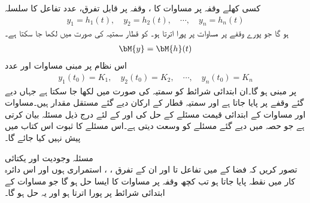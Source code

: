 کسی کھلے وقفہ  پر مساوات  کا ، وقفہ  پر قابل تفرق،  عدد  تفاعل کا سلسلہ
\begin{align*}
y_1=h_1(t),\quad y_2=h_2(t),\quad \cdots, \quad y_n=h_n(t)
\end{align*}
ہو گا جو  پورے  وقفے پر مساوات  پر پورا اترتا ہو۔ کو قطار سمتیہ  کی صورت میں لکھا جا سکتا ہے۔
\begin{align*}
\bM{y}=\bM{h}(t)
\end{align*}
اس نظام پر مبنی  مساوات  اور   عدد  
\begin{align}\label{مساوات_نظام_عمومی_ب}
y_1(t_0)=K_1, \quad y_2(t_0)=K_2,\quad \cdots,\quad y_n(t_0)=K_n
\end{align}
پر مبنی ہو گا۔ان ابتدائی شرائط کو سمتیہ کی صورت میں  لکھا جا سکتا ہے جہاں  دیے گئے وقفے پر پایا جاتا ہے اور سمتیہ قطار  کے ارکان دیے گئے مستقل مقدار ہیں۔مساوات  اور مساوات  کے ابتدائی قیمت مسئلے کے حل کی  اور  کے لئے  درج ذیل مسئلہ بیان کرتی ہے جو حصہ  میں دیے گئے مسئلے کو وسعت دیتی ہے۔اس مسئلے کا ثبوت اس کتاب میں پیش نہیں کیا جائے گا۔

\quad مسئلہ وجودیت اور یکتائی \\
تصور کریں کہ فضا  کے   میں  تفاعل  تا  اور ان کے تفرق ،   ،   استمراری ہوں اور اس دائرہ کار میں نقطہ  پایا جاتا ہو تب کچھ وقفہ  پر مساوات  کا ایسا حل  ہو گا جو مساوات  کے ابتدائی شرائط پر پورا اترتا ہو اور  یہ حل  ہو گا۔

